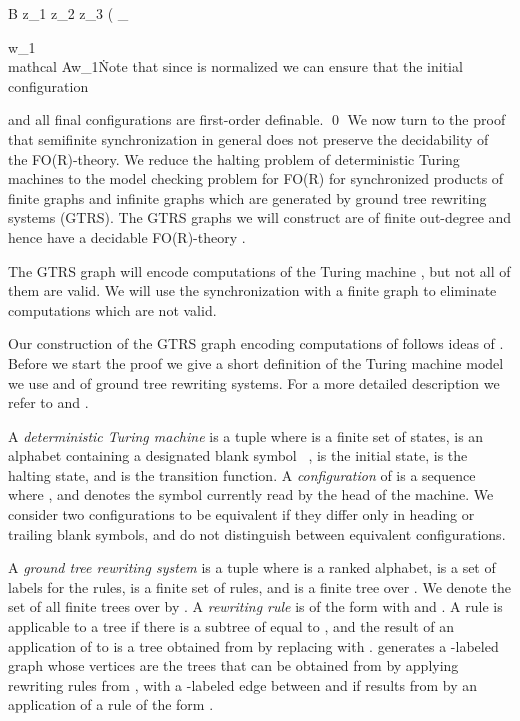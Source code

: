 \documentclass{LMCS}
\renewcommand{\phi}{\varphi}
\begin{document}
 \mathcal B \models \exists z_1 \exists z_2 \exists z_3 \Big( \phi_{w_1\\mathcal Aw_1\.
Note that since  is normalized we can ensure that the initial configuration 

and all final configurations  are first-order definable.
\qed
We now turn to the proof that semifinite synchronization in general does not
preserve the decidability of the FO(R)-theory. We reduce the halting problem of 
deterministic Turing machines to the model checking problem for FO(R) for 
synchronized products of finite graphs and infinite graphs which are generated by  
ground tree rewriting systems (GTRS). The GTRS graphs we will construct are of finite out-degree 
and hence have a decidable FO(R)-theory \cite{loe02,loe03}.

The GTRS graph will encode computations of the Turing machine , but not all
of them are valid. We will use the synchronization with a finite graph to eliminate 
computations which are not valid.

Our construction of the GTRS graph encoding computations of  follows
ideas of \cite{loe03}. Before we start the proof we 
give a short definition of the Turing machine model we use and of ground 
tree rewriting systems. For a more detailed description we refer to  
\cite{hu79} and \cite{loe03}.

A \emph{deterministic Turing machine} is a tuple  where
 is a finite set of states,  is an alphabet containing a
designated blank symbol \textvisiblespace~,  is the initial state, 
is the halting state, and  is the transition function. A \emph{configuration} of  is a sequence
 where , 
and  denotes the symbol currently read by the head of the machine. We consider
two configurations to be equivalent if they differ only in heading or trailing blank 
symbols, and do not distinguish between equivalent configurations.

A \emph{ground tree rewriting system} is a tuple 
where  is a ranked alphabet,  is a set of labels for the 
rules,  is a finite set of rules, and  is a finite tree over .
We denote the set of all finite trees over  by . A \emph{rewriting rule}
 is of the form  with  and .
A rule  is applicable to a tree  if there is a subtree  of  equal to ,
and the result of an application of  to  is a tree  obtained from 
by replacing  with .  generates a -labeled graph 
whose vertices are the trees that can be obtained from  by applying 
rewriting rules from , with a -labeled edge between  and  if
 results from  by an application of a rule of the form  .

}
\end{document}
